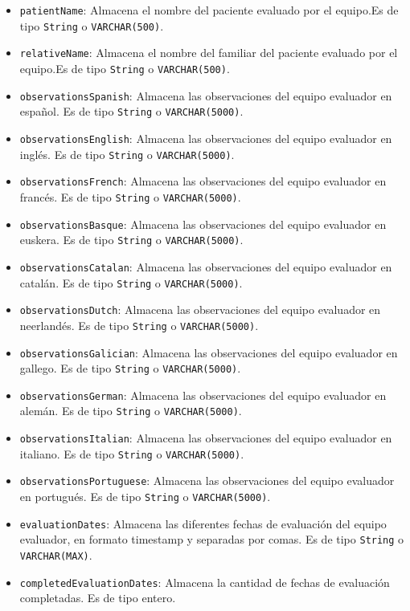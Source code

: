 \begin{itemize}
\begin{itemize}
        \item \texttt{patientName}: Almacena el nombre del paciente evaluado por el equipo.Es de tipo \texttt{String} o \texttt{VARCHAR(500)}.
        \item \texttt{relativeName}: Almacena el nombre del familiar del paciente evaluado por el equipo.Es de tipo \texttt{String} o \texttt{VARCHAR(500)}.
        \item \texttt{observationsSpanish}: Almacena las observaciones del equipo evaluador en español. Es de tipo \texttt{String} o \texttt{VARCHAR(5000)}.
        \item \texttt{observationsEnglish}: Almacena las observaciones del equipo evaluador en inglés. Es de tipo \texttt{String} o \texttt{VARCHAR(5000)}.
        \item \texttt{observationsFrench}: Almacena las observaciones del equipo evaluador en francés. Es de tipo \texttt{String} o \texttt{VARCHAR(5000)}.
        \item \texttt{observationsBasque}: Almacena las observaciones del equipo evaluador en euskera. Es de tipo \texttt{String} o \texttt{VARCHAR(5000)}.
        \item \texttt{observationsCatalan}: Almacena las observaciones del equipo evaluador en catalán. Es de tipo \texttt{String} o \texttt{VARCHAR(5000)}.
        \item \texttt{observationsDutch}: Almacena las observaciones del equipo evaluador en neerlandés. Es de tipo \texttt{String} o \texttt{VARCHAR(5000)}.
        \item \texttt{observationsGalician}: Almacena las observaciones del equipo evaluador en gallego. Es de tipo \texttt{String} o \texttt{VARCHAR(5000)}.
        \item \texttt{observationsGerman}: Almacena las observaciones del equipo evaluador en alemán. Es de tipo \texttt{String} o \texttt{VARCHAR(5000)}.
        \item \texttt{observationsItalian}: Almacena las observaciones del equipo evaluador en italiano. Es de tipo \texttt{String} o \texttt{VARCHAR(5000)}.
        \item \texttt{observationsPortuguese}: Almacena las observaciones del equipo evaluador en portugués. Es de tipo \texttt{String} o \texttt{VARCHAR(5000)}. 
        \item \texttt{evaluationDates}: Almacena las diferentes fechas de evaluación del equipo evaluador, en formato timestamp y separadas por comas. Es de tipo \texttt{String} o \texttt{VARCHAR(MAX)}.
        \item \texttt{completedEvaluationDates}: Almacena la cantidad de fechas de evaluación completadas. Es de tipo entero.

\end{itemize}
\end{itemize}
